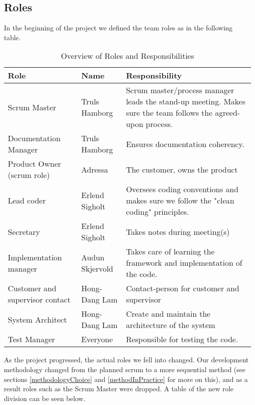 \subsection{Roles}
In the beginning of the project we defined the team roles as in the following table.

\begin{table}[H]
  \begin{tabular}{|l|l|p{5cm}|}
    \hline
    \textbf{Role} & \textbf{Name} & \textbf{Responsibility}\\
    \hline 
    Scrum Master & Truls Hamborg &  Scrum master/process manager leads the stand-up meeting. Makes sure the team follows the agreed-upon process. \\ \hline
    Documentation Manager & Truls Hamborg &  Ensures documentation coherency. \\ \hline
    Product Owner (scrum role) & Adressa & The customer, owns the product\\ \hline
    Lead coder & Erlend Sigholt & Oversees coding conventions and makes sure we follow the "clean coding" principles. \\ \hline
    Secretary & Erlend Sigholt & Takes notes during meeting(s) \\ \hline
    Implementation manager & Audun Skjervold & Takes care of learning the framework and implementation of the code.\\ \hline
    Customer and supervisor contact & Hong-Dang Lam & Contact-person for customer and supervisor \\ \hline
    System Architect & Hong-Dang Lam & Create and maintain the architecture of the system \\
    \hline
    Test Manager & Everyone & Responsible for testing the code.\\
    \hline
  \end{tabular}
  \caption{Overview of Roles and Responsibilities}
  \end{table}
  
As the project progressed, the actual roles we fell into changed. Our development methodology changed from the planned scrum to a more sequential method (see sections \ref{methodologyChoice} and \ref{methodInPractice} for more on this), and as a result roles such as the Scrum Master were dropped. A table of the new role division can be seen below.

